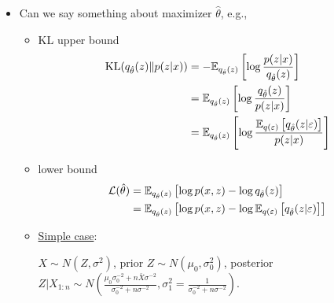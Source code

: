 \documentclass[10pt]{article}
\begin{document}
\begin{itemize}

\item
Can we say something about \elbo maximizer $\hat\theta$, e.g.,
\begin{itemize}
\item
KL upper bound
\begin{align*}
\text{KL}(q_{\hat\theta}(z)\|p(z|x)) &= -\mathbb{E}_{q_{\hat\theta}(z)}\left[\log\frac{p(z|x)}{q_{\hat\theta}(z)}\right] \\
&= \mathbb{E}_{q_{\hat\theta}(z)}\left[\log\frac{q_{\hat\theta}(z)}{p(z|x)}\right] \\
&= \mathbb{E}_{q_{\hat\theta}(z)}\left[\log\frac{\mathbb{E}_{q(\varepsilon)}\left[q_{\hat\theta}(z|\varepsilon)\right]}{p(z|x)}\right]
\end{align*}
\item
\elbo lower bound
\begin{align*}
\mathcal{L}(\hat\theta) &= \mathbb{E}_{q_{\hat\theta}(z)}\left[\log p(x,z) - \log q_{\hat\theta}(z)\right] \\
&= \mathbb{E}_{q_{\hat\theta}(z)}\left[\log p(x,z) - \log \mathbb{E}_{q(\varepsilon)}\left[q_{\hat\theta}(z|\varepsilon)\right]\right]
\end{align*}
\item
\href{https://stats.stackexchange.com/questions/308838/marginal-likelihood-derivation-for-normal-likelihood-and-prior}{Simple case}:

$X\sim N(Z,\sigma^2)$, prior $Z\sim N(\mu_0,\sigma^2_0)$, posterior $Z|X_{1:n}\sim N\left(\frac{\mu_0\sigma_0^{-2}+n\bar{X}\sigma^{-2}}{\sigma_0^{-2}+n\sigma^{-2}}, \sigma_1^2=\frac{1}{\sigma_0^{-2}+n\sigma^{-2}}\right)$.


\end{itemize}
\end{itemize}
\end{document}
